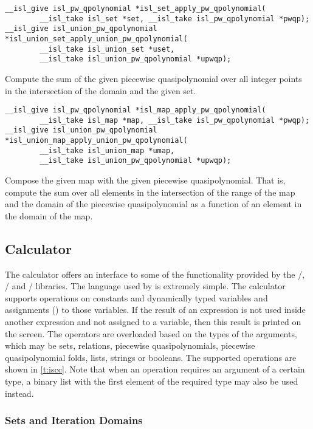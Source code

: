 \begin{verbatim}
__isl_give isl_pw_qpolynomial *isl_set_apply_pw_qpolynomial(
        __isl_take isl_set *set, __isl_take isl_pw_qpolynomial *pwqp);
__isl_give isl_union_pw_qpolynomial *isl_union_set_apply_union_pw_qpolynomial(
        __isl_take isl_union_set *uset,
        __isl_take isl_union_pw_qpolynomial *upwqp);
\end{verbatim}
Compute the sum of the given piecewise quasipolynomial over
all integer points in the intersection of the domain and the given set.

\begin{verbatim}
__isl_give isl_pw_qpolynomial *isl_map_apply_pw_qpolynomial(
        __isl_take isl_map *map, __isl_take isl_pw_qpolynomial *pwqp);
__isl_give isl_union_pw_qpolynomial *isl_union_map_apply_union_pw_qpolynomial(
        __isl_take isl_union_map *umap,
        __isl_take isl_union_pw_qpolynomial *upwqp);
\end{verbatim}
Compose the given map with the given piecewise quasipolynomial.
That is, compute the sum over all elements in the intersection
of the range of the map and the domain of the piecewise quasipolynomial
as a function of an element in the domain of the map.

\subsection{Calculator}

The  calculator offers an interface to some
of the functionality provided by the \isl/, \cloog/ and \barvinok/
libraries.
The language used by  is extremely simple.  The calculator
supports operations on constants and dynamically typed variables and
assignments (\ai[\tt]{:=}) to those variables.  If the result of an expression
is not used inside another expression and not assigned to a variable,
then this result is printed on the screen.  The operators are overloaded
based on the types of the arguments, which may be sets, relations,
piecewise quasipolynomials, piecewise quasipolynomial folds, lists,
strings or booleans.
The supported operations are shown in \autoref{t:iscc}.
Note that when an operation requires an argument of a certain
type, a binary list with the first element of the required type
may also be used instead.

\subsubsection{Sets and Iteration Domains}

